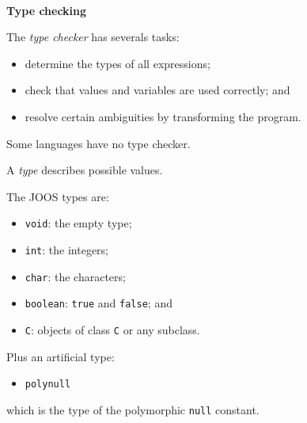 



\begin{slide*}
\begin{tabbing}
~\\
{\Huge\bf Type checking}\\
\end{tabbing}

\vspace{0.4in}

\begin{center}
\end{center}

\vfil
\end{slide*}
 
\begin{slide*}
The {\em type checker\/} has severals tasks:
\begin{itemize}
\item determine the types of all expressions;
\item check that values and variables are used correctly; and
\item resolve certain ambiguities by transforming the program.
\end{itemize}

Some languages have no type checker.

\vfil
\end{slide*}
 
\begin{slide*}
A {\em type\/} describes possible values.

The JOOS types are:
\begin{itemize}
\item {\tt void}: the empty type;
\item {\tt int}: the integers;
\item {\tt char}: the characters;
\item {\tt boolean}: {\tt true} and {\tt false}; and
\item {\tt C}: objects of class {\tt C} or any subclass.
\end{itemize}
Plus an artificial type:
\begin{itemize}
\item {\tt polynull}
\end{itemize}
which is the type of the polymorphic {\tt null} constant.

\vfil
\end{slide*}

